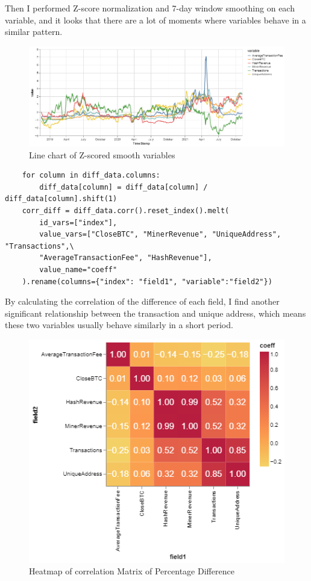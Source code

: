 \documentclass[a4paper]{article}
\begin{document}
Then I performed Z-score normalization and 7-day window smoothing on each variable, and it looks that there are a lot of moments where variables behave in a similar pattern.
\begin{figure}[H]
    \centering
    \includegraphics[scale=0.5]{LineChart.png}
    \caption{Line chart of Z-scored smooth variables}
\end{figure}
\begin{verbatim}
    for column in diff_data.columns:
        diff_data[column] = diff_data[column] / diff_data[column].shift(1)
    corr_diff = diff_data.corr().reset_index().melt(
        id_vars=["index"], 
        value_vars=["CloseBTC", "MinerRevenue", "UniqueAddress", "Transactions",\
        "AverageTransactionFee", "HashRevenue"],
        value_name="coeff"
    ).rename(columns={"index": "field1", "variable":"field2"})
\end{verbatim}
By calculating the correlation of the difference of each field, I find another significant relationship between the transaction and unique address, which means these two variables usually behave similarly in a short period.
\begin{figure}[H]
    \centering
    \includegraphics[scale=0.5]{HeatmapDiff.png}
    \caption{Heatmap of correlation Matrix of Percentage Difference}
\end{figure}
\end{document}
